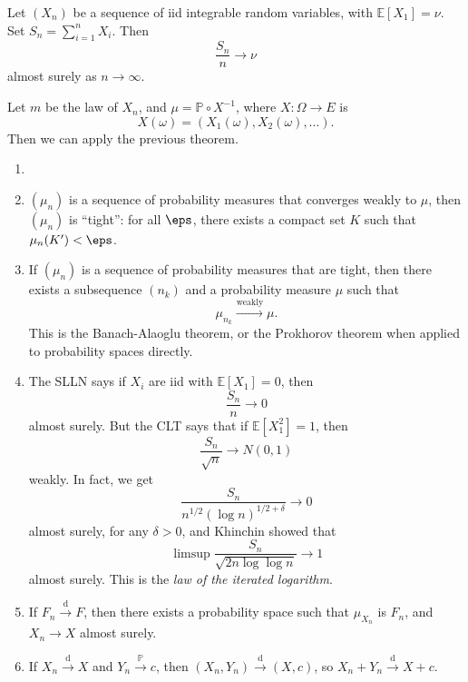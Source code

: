\documentclass[12pt]{article}
\begin{document}
\begin{theorem}
	Let $(X_n)$ be a sequence of iid integrable random variables, with $\mathbb{E}[X_1] = \nu$. Set $S_n = \sum_{i = 1}^n X_i$. Then
	\[
	\frac{S_n}{n} \to \nu
	\]
	almost surely as $n \to \infty$.
\end{theorem}

\begin{proofbox}
	Let $m$ be the law of $X_n$, and $\mu = \mathbb{P} \circ X^{-1}$, where $X : \Omega \to E$ is
	\[
	X(\omega) = (X_1(\omega), X_2(\omega), \ldots).
	\]
	Then we can apply the previous theorem.
\end{proofbox}

\begin{remark}
	\begin{enumerate}
		\item[]
		\item $(\mu_n)$ is a sequence of probability measures that converges weakly to $\mu$, then $(\mu_n)$ is ``tight'': for all $\eps$, there exists a compact set $K$ such that $\mu_n(K') < \eps$.
		\item If $(\mu_n)$ is a sequence of probability measures that are tight, then there exists a subsequence $(n_k)$ and a probability measure $\mu$ such that
			\[
				\mu_{n_k} \overset{\text{weakly}}{\to} \mu.
			\]
			This is the Banach-Alaoglu theorem, or the Prokhorov theorem when applied to probability spaces directly.
		\item The SLLN says if $X_i$ are iid with $\mathbb{E}[X_1] = 0$, then
			\[
			\frac{S_n}{n} \to 0
			\]
			almost surely. But the CLT says that if $\mathbb{E}[X_1^2] = 1$, then
			\[
			\frac{S_n}{\sqrt n} \to N(0, 1)
			\]
			weakly. In fact, we get
			\[
			\frac{S_n}{n^{1/2}(\log n)^{1/2 + \delta}} \to 0
			\]
			almost surely, for any $\delta > 0$, and Khinchin showed that
			\[
				\limsup \frac{S_n}{\sqrt{2n \log \log n}} \to 1
			\]
			almost surely. This is the \emph{law of the iterated logarithm}.
		\item If $F_n \overset{\text{d}}{\to} F$, then there exists a probability space such that $\mu_{X_n}$ is $F_n$, and $X_n \to X$ almost surely.
		\item If $X_n \overset{\text{d}}{\to} X$ and $Y_n \overset{\mathbb{P}}{\to} c$, then $(X_n, Y_n) \overset{\text{d}}{\to} (X, c)$, so $X_n + Y_n \overset{\text{d}}{\to} X + c$.
	\end{enumerate}
	
\end{remark}


\newpage

\printindex
\end{document}
